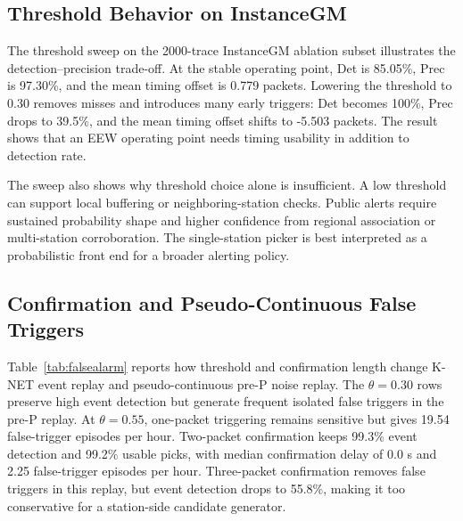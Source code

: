 \documentclass[journal]{IEEEtran}
\begin{document}
\subsection{Threshold Behavior on InstanceGM}
The threshold sweep on the 2000-trace InstanceGM ablation subset illustrates the detection--precision trade-off. At the stable operating point, Det is 85.05\%, Prec is 97.30\%, and the mean timing offset is 0.779 packets. Lowering the threshold to 0.30 removes misses and introduces many early triggers: Det becomes 100\%, Prec drops to 39.5\%, and the mean timing offset shifts to -5.503 packets. The result shows that an EEW operating point needs timing usability in addition to detection rate.

The sweep also shows why threshold choice alone is insufficient. A low threshold can support local buffering or neighboring-station checks. Public alerts require sustained probability shape and higher confidence from regional association or multi-station corroboration. The single-station picker is best interpreted as a probabilistic front end for a broader alerting policy.

\subsection{Confirmation and Pseudo-Continuous False Triggers}
Table~\ref{tab:falsealarm} reports how threshold and confirmation length change K-NET event replay and pseudo-continuous pre-P noise replay. The $\theta=0.30$ rows preserve high event detection but generate frequent isolated false triggers in the pre-P replay. At $\theta=0.55$, one-packet triggering remains sensitive but gives 19.54 false-trigger episodes per hour. Two-packet confirmation keeps 99.3\% event detection and 99.2\% usable picks, with median confirmation delay of 0.0 s and 2.25 false-trigger episodes per hour. Three-packet confirmation removes false triggers in this replay, but event detection drops to 55.8\%, making it too conservative for a station-side candidate generator.
\end{document}
